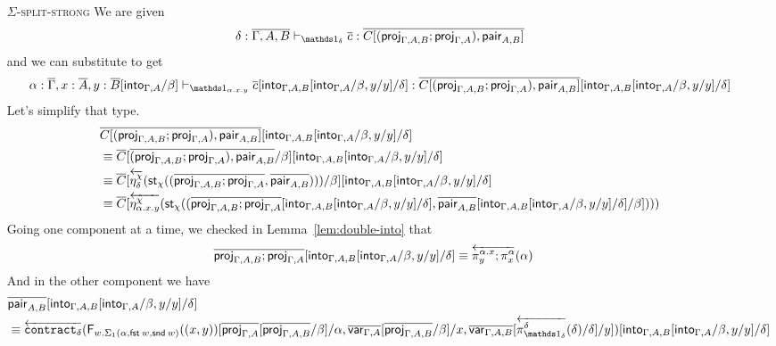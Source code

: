 \documentclass[10pt]{article}
\theoremstyle{definition}
\newcommand\dsd[1]{\ensuremath{\mathsf{#1}}}
\newcommand{\yields}{\vdash}
\newcommand{\app}[2]{\ensuremath{#1 \: #2}}
\newcommand{\fst}[1]{\app{\dsd{fst}}{#1}}
\newcommand{\snd}[1]{\app{\dsd{snd}}{#1}}
\newcommand{\rewrite}[2]{\overleftarrow{#1}(#2)}
\newcommand\StI[2]{\ensuremath{\mathsf{st}_{#1}(#2)}}
\newcommand\FIs[2]{\ensuremath{\mathsf{F}_{#1}{(#2)}}}
\begin{document}
\begin{enumerate}[style = multiline, labelwidth = 80pt]
\item[\textsc{$\Sigma$-split-strong}] We are given
\begin{align*}
\delta : \upstairs{\Gamma, A, B} \yields_{\One_\delta} \upstairs{c} :\upstairs{C[(\proj{\Gamma, A, B};\proj{\Gamma, A}), \qpair{A,B}]} 
\end{align*}
and we can substitute to get
\begin{align*}
\alpha : \upstairs{\Gamma}, x : \upstairs{A}, y : \upstairs{B}[\into{\Gamma,A}/\beta] \yields_{\One_{\alpha.x.y}} \upstairs{c}[\into{\Gamma, A, B}[\into{\Gamma, A}/\beta, y/y] /\delta] : \upstairs{C[(\proj{\Gamma, A, B};\proj{\Gamma, A}), \qpair{A,B}]}[\into{\Gamma, A, B}[\into{\Gamma, A}/\beta, y/y] /\delta]
\end{align*}
Let's simplify that type.
\begin{align*}
&\upstairs{C[(\proj{\Gamma, A, B};\proj{\Gamma, A}), \qpair{A,B}]}[\into{\Gamma, A, B}[\into{\Gamma, A}/\beta, y/y] /\delta] \\
&\equiv \upstairs{C}[\upstairs{(\proj{\Gamma, A, B};\proj{\Gamma, A}), \qpair{A,B}}/\beta][\into{\Gamma, A, B}[\into{\Gamma, A}/\beta, y/y] /\delta] \\
&\equiv \upstairs{C}[\rewrite{\eta^\chi_{\delta}}{\StI{\chi}{(\upstairs{\proj{\Gamma, A, B};\proj{\Gamma, A}}, \upstairs{\qpair{A,B}})}}/\beta][\into{\Gamma, A, B}[\into{\Gamma, A}/\beta, y/y] /\delta] \\
&\equiv \upstairs{C}[\rewrite{\eta^\chi_{\alpha.x.y}}{\StI{\chi}{(\upstairs{\proj{\Gamma, A, B};\proj{\Gamma, A}}[\into{\Gamma, A, B}[\into{\Gamma, A}/\beta, y/y] /\delta], \upstairs{\qpair{A,B}}[\into{\Gamma, A, B}[\into{\Gamma, A}/\beta, y/y] /\delta]/\beta])}}
\end{align*}
Going one component at a time, we checked in Lemma~\ref{lem:double-into} that
\begin{align*}
\upstairs{\proj{\Gamma, A, B};\proj{\Gamma, A}}[\into{\Gamma, A, B}[\into{\Gamma, A}/\beta, y/y] /\delta] 
&\equiv \rewrite{\pi^{\alpha.x}_y;\pi^\alpha_x}{\alpha}
\end{align*}
And in the other component we have
\begin{align*}
&\upstairs{\qpair{A,B}}[\into{\Gamma, A, B}[\into{\Gamma, A}/\beta, y/y] /\delta] \\
&\equiv \rewrite{\contract{\delta}}{\FIs{w. \Sigma_1(\alpha,\fst w, \snd w)}{(x, y)}[\upstairs{\proj{\Gamma, A}}[\upstairs{\proj{\Gamma, A, B}}/\beta]/\alpha, \upstairs{\qvar{\Gamma, A}}[\upstairs{\proj{\Gamma, A, B}}/\beta]/x, \upstairs{\qvar{\Gamma, A, B}}[\rewrite{\pi^\delta_{\One_\delta}}{\delta}/\delta]/y]}[\into{\Gamma, A, B}[\into{\Gamma, A}/\beta, y/y] /\delta] \\

\end{align*}
\end{enumerate}
\end{document}
